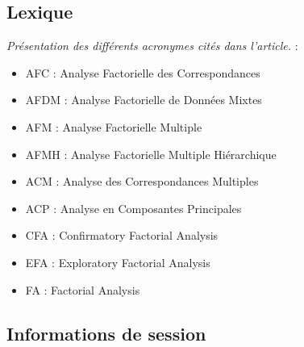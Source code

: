 \documentclass[
  french,
  11pt,
  a4paper,
]{article}
\providecommand{\tightlist}{%
  \setlength{\itemsep}{0pt}\setlength{\parskip}{0pt}}
\begin{document}
\subsection*{Lexique}\label{lexique-1}

\emph{Présentation des différents acronymes cités dans l'article.} :

\begin{itemize}
\tightlist
\item
  AFC : Analyse Factorielle des Correspondances
\item
  AFDM : Analyse Factorielle de Données Mixtes
\item
  AFM : Analyse Factorielle Multiple
\item
  AFMH : Analyse Factorielle Multiple Hiérarchique
\item
  ACM : Analyse des Correspondances Multiples
\item
  ACP : Analyse en Composantes Principales
\item
  CFA : Confirmatory Factorial Analysis
\item
  EFA : Exploratory Factorial Analysis
\item
  FA : Factorial Analysis
\end{itemize}

\subsection*{Informations de session}\label{informations-de-session}
\end{document}
